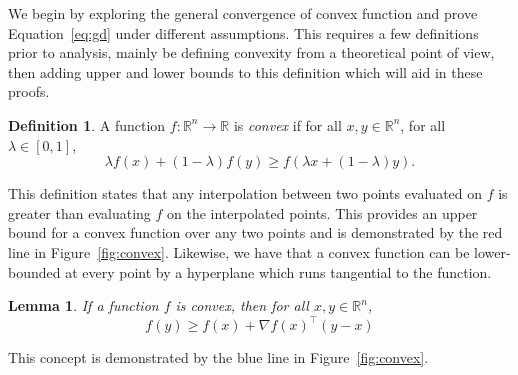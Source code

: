 \documentclass{article}
\newcommand{\R}{\mathbb R}
\newtheorem{lemma}{Lemma}
\theoremstyle{definition}
\newtheorem{definition}{Definition}
\begin{document}
We begin by exploring the general convergence of convex function and prove
Equation~\ref{eq:gd} under different assumptions.  This requires a few
definitions prior to analysis, mainly be defining convexity from a theoretical
point of view, then adding upper and lower bounds to this definition which will
aid in these proofs. 

\begin{definition}
    A function $f: \R^n \rightarrow \R$ is \emph{convex} if for all $x, y \in
    \R^n$, for all $\lambda \in [0, 1]$,
    \begin{equation}
        \lambda f(x) + (1 - \lambda)f(y) \geq f(\lambda x + (1 - \lambda)y).
    \end{equation}
\end{definition}

This definition states that any interpolation between two points
evaluated on $f$ is greater than evaluating $f$ on the interpolated points. This
provides an upper bound for a convex function over any two points and is
demonstrated by the red line in Figure~\ref{fig:convex}. Likewise, we
have that a convex function can be lower-bounded at every point by a hyperplane
which runs tangential to the function.

\begin{lemma}
    \label{lem:convex_bound}
    If a function $f$ is convex, then for all $x, y \in \R^n$,
    \begin{equation}
        f(y) \geq f(x) + \nabla {f(x)}^\intercal (y - x)
    \end{equation}
\end{lemma}

This concept is demonstrated by the blue line in Figure~\ref{fig:convex}. 
\end{document}
